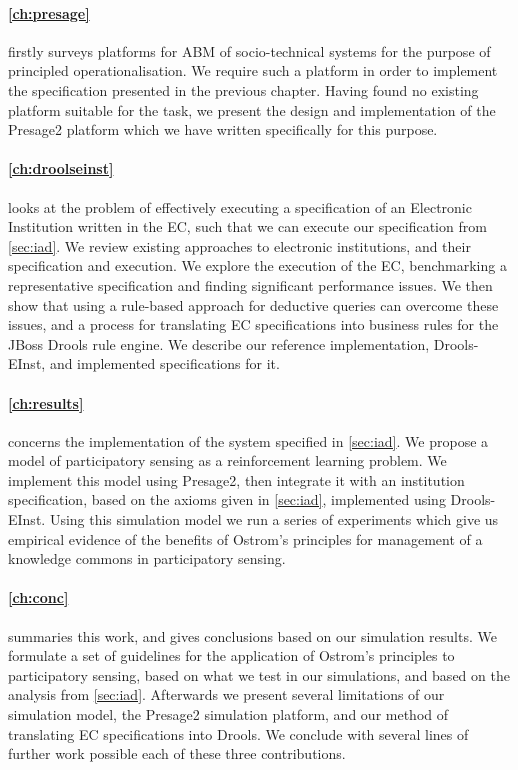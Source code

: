 \paragraph{\autoref{ch:presage}} firstly surveys platforms for \ac{ABM} of
socio-technical systems for the purpose of principled operationalisation. We
require such a platform in order to implement the specification presented in
the previous chapter. Having found no existing platform suitable for the task,
we present the design and implementation of the Presage2 platform which we
have written specifically for this purpose.

\paragraph{\autoref{ch:droolseinst}} looks at the problem of effectively
executing a specification of an Electronic Institution written in the \ac{EC},
such that we can execute our specification from \autoref{sec:iad}. We review
existing approaches to electronic institutions, and their specification and
execution. We explore the execution of the \ac{EC}, benchmarking a
representative specification and finding significant performance issues. We
then show that using a rule-based approach for deductive queries can overcome
these issues, and a process for translating \ac{EC} specifications into
business rules for the JBoss Drools rule engine. We describe our reference
implementation, Drools-EInst, and implemented specifications for it.

\paragraph{\autoref{ch:results}} concerns the implementation of the system
specified in \autoref{sec:iad}. We propose a model of participatory sensing as
a reinforcement learning problem. We implement this model using Presage2, then
integrate it with an institution specification, based on the axioms given in
\autoref{sec:iad}, implemented using Drools-EInst. Using this simulation model
we run a series of experiments which give us empirical evidence of the
benefits of Ostrom's principles for management of a knowledge commons in
participatory sensing.

\paragraph{\autoref{ch:conc}}
summaries this work, and gives conclusions based on our simulation results. We formulate a set of guidelines for the application of Ostrom's principles to participatory sensing, based on what we test in our simulations, and based on the analysis from \autoref{sec:iad}. Afterwards we present several limitations of our simulation model, the Presage2 simulation platform, and our method of translating \ac{EC} specifications into Drools. We conclude with several lines of further work possible each of these three contributions.

